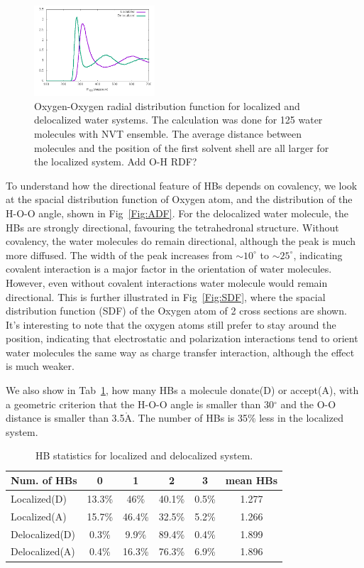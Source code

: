 \documentclass[prl,twocolumn,showpacs]{revtex4}
\begin{document}
\begin{figure}
\includegraphics[width=0.4\textwidth]{RDF}
\caption{Oxygen-Oxygen radial distribution function for localized and delocalized water systems. The calculation was done for  125 water molecules with NVT ensemble. The average distance between molecules and the position of the first solvent shell are all larger for the localized system. \new Add O-H RDF? \old} \label{Fig:RDF}
\end{figure}


To understand how the directional feature of HBs depends on covalency, we look at the spacial distribution function of Oxygen atom, and the distribution of the H-O-O angle, shown in Fig~\ref{Fig:ADF}. For the delocalized water molecule, the HBs are strongly directional, favouring the tetrahedronal structure. Without covalency, the water molecules do remain directional, although the peak is much more diffused. The width of the peak increases from $\sim 10 ^{\circ}$ to $\sim 25^{\circ}$, indicating covalent interaction is a major factor in the orientation of water molecules. However, even without covalent interactions water molecule would remain directional. This is further illustrated in Fig~\ref{Fig:SDF}, where the spacial distribution function (SDF) of the Oxygen atom of 2 cross sections are shown. \new It's interesting to note that the oxygen atoms still prefer to stay around the position, indicating that electrostatic and polarization interactions tend to orient water molecules the same way as charge transfer interaction, although the effect is much weaker. \old

We also show in Tab~\ref{HBstat}, how many HBs a molecule donate(D) or accept(A), with a geometric criterion that the H-O-O angle is smaller than 30$^{\circ}$ and the O-O distance is smaller than 3.5$\mathring{\text{A}}$. The number of HBs is 35\% less in the localized system.

\begin{table}
\caption{HB statistics for localized and delocalized system.}\label{HBstat}
\begin{tabular}{l|*{5}{c}}
\hline
Num. of HBs              & 0 & 1 & 2 & 3 &mean HBs \\
\hline
Localized(D)               & 13.3\% & 46\% & 40.1\% & 0.5\% & 1.277  \\
Localized(A)               & 15.7\% & 46.4\% & 32.5\% & 5.2\% & 1.266 \\
Delocalized(D)             & 0.3\% & 9.9\% & 89.4\% & 0.4\% & 1.899\\
Delocalized(A)             & 0.4\% & 16.3\% & 76.3\% & 6.9\% & 1.896 \\

\end{tabular}

\end{table}
\end{document}
